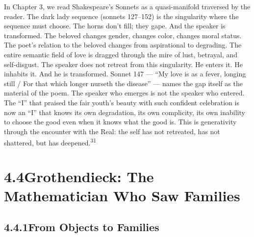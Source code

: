 In Chapter 3, we read Shakespeare’s Sonnets as a quasi-manifold traversed by the reader. The dark lady sequence (sonnets 127–152) is the singularity where the sequence must choose. The horns don’t fill; they gape. And the speaker is transformed. The beloved changes gender, changes color, changes moral status. The poet’s relation to the beloved changes from aspirational to degrading. The entire semantic field of love is dragged through the mire of lust, betrayal, and self-disgust. The speaker does not retreat from this singularity. He enters it. He inhabits it. And he is transformed. Sonnet 147 — “My love is as a fever, longing still / For that which longer nurseth the disease” — names the gap itself as the material of the poem. The speaker who emerges is not the speaker who entered. The “I” that praised the fair youth’s beauty with such confident celebration is now an “I” that knows its own degradation, its own complicity, its own inability to choose the good even when it knows what the good is. This is generativity through the encounter with the Real: the self has not retreated, has not shattered, but has deepened.\textsuperscript{31}


\section{4.4\quad Grothendieck: The Mathematician Who Saw Families}

\subsection{4.4.1\quad From Objects to Families}

